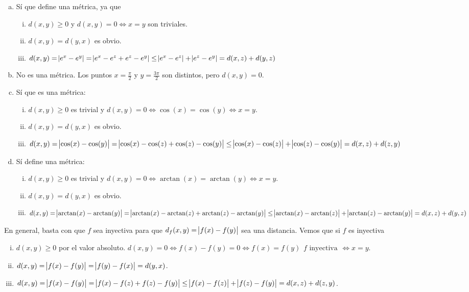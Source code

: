\begin{ej}
	\begin{enumerate}[(a)]
		\item Sí que define una m\'etrica, ya que
			\begin{enumerate}[i)]
				\item $d(x,y) \geq 0$ y $d(x,y) = 0 \iff x = y$ son triviales.
				\item $d(x,y) = d(y,x)$ es obvio.
				\item $d(x,y) = \abs{e^x - e^y} = \abs{e^x - e^z + e^z - e^y} \leq \abs{e^x - e^z} + \abs{e^z - e^y} = d(x,z) + d(y,z)$
			\end{enumerate}
		\item No es una m\'etrica. Los puntos $x = \frac{\pi}{2}$ y $y = \frac{3\pi}{2}$ son distintos, pero $d(x, y) = 0$.
		\item Sí que es una m\'etrica:
			\begin{enumerate}[i)]
				\item $d(x, y) \geq 0$ es trivial y $d(x,y) = 0 \iff \cos(x) = \cos(y) \iff x = y$.
				\item $d(x, y) = d(y,x)$ es obvio.
				\item $d(x, y) = \abs{\cos(x) - \cos(y)} = \abs{\cos(x) - \cos(z) + \cos(z) - \cos(y)} \leq \abs{\cos(x) - \cos(z)}
					+ \abs{\cos(z) - \cos(y)} = d(x,z) + d(z,y)$
			\end{enumerate}
		\item Sí define una m\'etrica:
			\begin{enumerate}[i)]
				\item $d(x, y) \geq 0$ es trivial y $d(x, y) = 0 \iff \arctan(x) = \arctan(y) \iff x = y$.
				\item $d(x, y) = d(y, x)$ es obvio.
				\item $d(x, y) = \abs{\arctan(x) - \arctan(y)} = \abs{\arctan(x) - \arctan(z) + \arctan(z) - \arctan(y)} \leq
					\abs{\arctan(x) - \arctan(z)} + \abs{\arctan(z) - \arctan(y)} = d(x, z) + d(y,z)$
			\end{enumerate}
	\end{enumerate}

	En general, basta con que $f$ sea inyectiva para que $d_f(x,y) = \abs{f(x) - f(y)}$ sea una distancia. Vemos que si $f$ es inyectiva
	\begin{enumerate}[i)]
		\item $d(x,y) \geq 0$ por el valor absoluto. $d(x, y) = 0 \iff f(x) - f(y) = 0 \iff f(x) = f(y) \substack{f \text{ inyectiva}}{\iff} x = y$.
		\item $d(x,y) = \abs{f(x) - f(y)} = \abs{f(y) - f(x)} = d(y,x)$.
		\item $d(x,y) = \abs{f(x) - f(y)} = \abs{f(x) - f(z) + f(z) - f(y)} \leq \abs{f(x) - f(z)} + \abs{f(z) - f(y)} = d(x, z) + d(z, y)$.
	\end{enumerate}
\end{ej}

